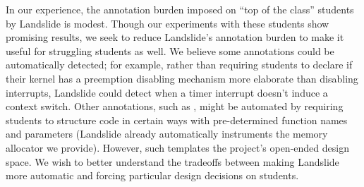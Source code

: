 In our experience,
the annotation burden imposed on ``top of the class'' students by Landslide is modest.
Though our experiments with these students show promising results, we seek to reduce Landslide's annotation burden to make it useful for struggling students as well.
%
We believe some annotations could be automatically detected;
for example, rather than requiring students to declare if their kernel has a preemption disabling mechanism more elaborate than disabling interrupts, Landslide could detect when a timer interrupt doesn't induce a context switch.
Other annotations, such as ,
might be automated by requiring students to structure code in
certain ways with pre-determined function names and parameters
(Landslide already automatically instruments the memory allocator we provide).
However,  such templates
the project's open-ended design space.
We wish to better understand the tradeoffs between
making Landslide more automatic and forcing particular design decisions on students.



